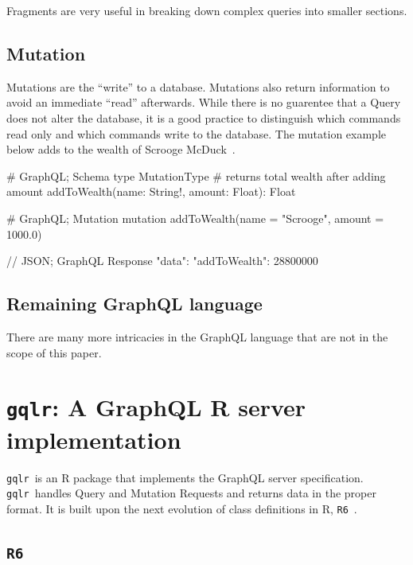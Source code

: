 \documentclass[stat,dissertation]{puthesis}\usepackage[]{graphicx}\usepackage{xcolor}
\newcommand{\pkg}[1]{\texttt{#1}}
\newcommand{\gqlr}{\pkg{gqlr}}
\begin{document}
Fragments are very useful in breaking down complex queries into smaller sections.

\subsection{Mutation}

Mutations are the ``write'' to a database.  Mutations also return information to avoid an immediate ``read'' afterwards.  While there is no guarentee that a Query does not alter the database, it is a good practice to distinguish which commands read only and which commands write to the database. The mutation example below adds to the wealth of Scrooge McDuck~\cite{scrooge}.

\begin{graphqlcode}
# GraphQL; Schema
type MutationType {
  # returns total wealth after adding amount
  addToWealth(name: String!, amount: Float): Float
}
\end{graphqlcode}
\begin{graphqlcode}
# GraphQL; Mutation
mutation {
  addToWealth(name = "Scrooge", amount = 1000.0)
}
\end{graphqlcode}
\begin{jscode}
// JSON; GraphQL Response
{
  "data": {
    "addToWealth": 28800000
  }}
\end{jscode}


\subsection{Remaining GraphQL language}

There are many more intricacies in the GraphQL language that are not in the scope of this paper.



\section{\gqlr: A GraphQL R server implementation}

\gqlr~is an R package that implements the GraphQL server specification.  \gqlr~handles Query and Mutation Requests and returns data in the proper format.  It is built upon the next evolution of class definitions in R, \pkg{R6}~\cite{r_r6}.

\subsection{\pkg{R6}}
\end{document}
